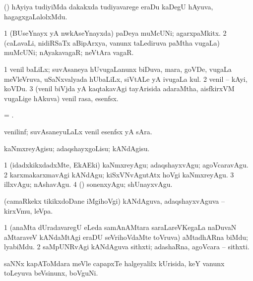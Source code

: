 \bentry
{} 
\gl{\nA}
\expl{}
\bmng
 (\nw) hAyiya tudiyiMda dakakxda tudiyavarege eraDu kaDegU hAyuva, hagagxgaLalolxMdu. 
\emng
\eentry

\bentry
{} 
\gl{\nA}
\expl{}
\bmng
\bnum
\num{1} (BUseYnayx yA nwkAseYnayxda) paDeya muMcUNi; agarxpaMkitx. 
\num{2} (caLavaLi, nidiRSaTx aBipArxya, \mo vanunx taLediruva paMtha \mo vugaLa) muMcUNi; nAyakavagaR; neVtAra vagaR. 
\enum
\emng
\eentry

\bentry
{} 
\gl{\nA}
\expl{}
\bmng
\bnum
\num{1} venil baLiLx; suvAsaneya hUvugaLanunx biDuva, mara, goVDe, \mo vugaLa meVleVruva, uSaNxvalyada hUbaLiLx, siVtALe yA ivugaLa kul. 
\hypertarget{vanilla(2)}{} 
\num{2} venil -- kAyi, koVDu. 
\num{3} (venil biVjda yA kaqtakavAgi tayArisida adaraMtha, aisfkirxVM \mo vugaLige hAkuva) venil rasa, esenfsx. 
\enum
\emng
\eentry

\bentry
{} 
\gl{\nA}
\expl{}
\bmng
 = . 
\emng
\eentry

\bentry
{} 
\gl{\nA}
\expl{}
\bmng
 venilinf; suvAsaneyuLaLx venil esenfsx yA sAra. 
\emng
\eentry

\bentry
{} 
\gl{\sakirx}
\expl{}
\bmng
 kaNmxreyAgisu; adaqshayxgoLisu; kANdAgisu. 
\emng

\noindent
\gl{\akirx}
\expl{}
\bmng
\bnum
\num{1} (idadxkikxdadxMte, EkAEki) kaNmxreyAgu; adaqshayxvAgu; agoVcaravAgu. 
\num{2} karxmakarxmavAgi kANdAgu; kiSxVNvAgutAtx hoVgi kaNmxreyAgu. 
\num{3} illxvAgu; nAshavAgu. 
\num{4} (\ga) sonenxyAgu; shUnayxvAgu. 
\enum
\emng
\eentry

\bentry
{}
\gl{\nA}
\expl{}
\bmng
 (camaRkekx tikikxdoDane iMgihoVgi) kANdAguva, adaqshayxvAguva -- kirxVmu, leVpa. 
\emng
\eentry

\bentry
{} 
\gl{\nA}
\expl{}
\bmng
\bnum
\num{1} (anaMta dUradavaregU eLeda samAnAMtara saraLareVKegaLa naDuvaN aMtaraveV kANdaMtAgi eraDU seVrihoVdaMte toVruva) aMtadhARna biMdu; lyabiMdu. 
\num{2} saMpUNRvAgi kANdAguva sithxti; adashaRna, agoVcara -- sithxti. 
\enum
\emng
\eentry

\bentry
{} 
\gl{\nA}
\bmng
 saNNx kapAToMdara meVle capapxTe halgeyalilx kUrisida, keY \mo vanunx toLeyuva beVsinunx, boVguNi. 
\emng
\eentry

